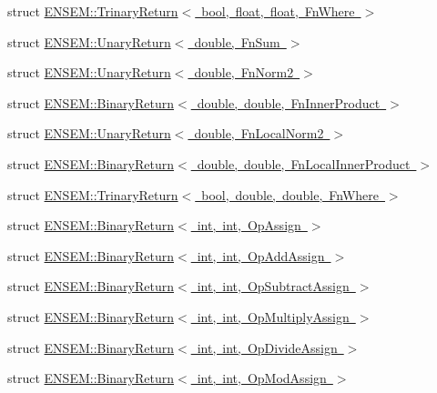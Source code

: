 \begin{DoxyCompactItemize}
\item 
struct \mbox{\hyperlink{structENSEM_1_1TrinaryReturn_3_01bool_00_01float_00_01float_00_01FnWhere_01_4}{E\+N\+S\+E\+M\+::\+Trinary\+Return$<$ bool, float, float, Fn\+Where $>$}}
\item 
struct \mbox{\hyperlink{structENSEM_1_1UnaryReturn_3_01double_00_01FnSum_01_4}{E\+N\+S\+E\+M\+::\+Unary\+Return$<$ double, Fn\+Sum $>$}}
\item 
struct \mbox{\hyperlink{structENSEM_1_1UnaryReturn_3_01double_00_01FnNorm2_01_4}{E\+N\+S\+E\+M\+::\+Unary\+Return$<$ double, Fn\+Norm2 $>$}}
\item 
struct \mbox{\hyperlink{structENSEM_1_1BinaryReturn_3_01double_00_01double_00_01FnInnerProduct_01_4}{E\+N\+S\+E\+M\+::\+Binary\+Return$<$ double, double, Fn\+Inner\+Product $>$}}
\item 
struct \mbox{\hyperlink{structENSEM_1_1UnaryReturn_3_01double_00_01FnLocalNorm2_01_4}{E\+N\+S\+E\+M\+::\+Unary\+Return$<$ double, Fn\+Local\+Norm2 $>$}}
\item 
struct \mbox{\hyperlink{structENSEM_1_1BinaryReturn_3_01double_00_01double_00_01FnLocalInnerProduct_01_4}{E\+N\+S\+E\+M\+::\+Binary\+Return$<$ double, double, Fn\+Local\+Inner\+Product $>$}}
\item 
struct \mbox{\hyperlink{structENSEM_1_1TrinaryReturn_3_01bool_00_01double_00_01double_00_01FnWhere_01_4}{E\+N\+S\+E\+M\+::\+Trinary\+Return$<$ bool, double, double, Fn\+Where $>$}}
\item 
struct \mbox{\hyperlink{structENSEM_1_1BinaryReturn_3_01int_00_01int_00_01OpAssign_01_4}{E\+N\+S\+E\+M\+::\+Binary\+Return$<$ int, int, Op\+Assign $>$}}
\item 
struct \mbox{\hyperlink{structENSEM_1_1BinaryReturn_3_01int_00_01int_00_01OpAddAssign_01_4}{E\+N\+S\+E\+M\+::\+Binary\+Return$<$ int, int, Op\+Add\+Assign $>$}}
\item 
struct \mbox{\hyperlink{structENSEM_1_1BinaryReturn_3_01int_00_01int_00_01OpSubtractAssign_01_4}{E\+N\+S\+E\+M\+::\+Binary\+Return$<$ int, int, Op\+Subtract\+Assign $>$}}
\item 
struct \mbox{\hyperlink{structENSEM_1_1BinaryReturn_3_01int_00_01int_00_01OpMultiplyAssign_01_4}{E\+N\+S\+E\+M\+::\+Binary\+Return$<$ int, int, Op\+Multiply\+Assign $>$}}
\item 
struct \mbox{\hyperlink{structENSEM_1_1BinaryReturn_3_01int_00_01int_00_01OpDivideAssign_01_4}{E\+N\+S\+E\+M\+::\+Binary\+Return$<$ int, int, Op\+Divide\+Assign $>$}}
\item 
struct \mbox{\hyperlink{structENSEM_1_1BinaryReturn_3_01int_00_01int_00_01OpModAssign_01_4}{E\+N\+S\+E\+M\+::\+Binary\+Return$<$ int, int, Op\+Mod\+Assign $>$}}

\end{DoxyCompactItemize}

